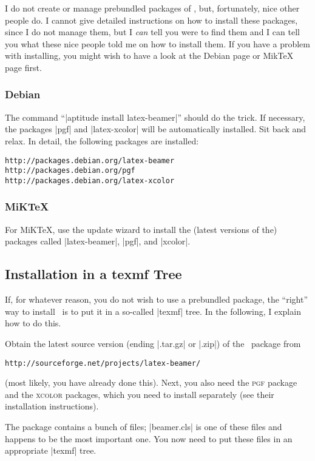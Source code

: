 I do not create or manage prebundled packages of \beamer, but,
fortunately, nice other people do. I cannot give detailed instructions
on how to install these packages, since I do not manage them, but I
\emph{can} tell you were to find them and I can tell you what these
nice people told me on how to install them. If you have a problem with
installing, you might wish to have a look at the Debian page or MikTeX
page first.


\subsubsection{Debian}

The command ``|aptitude install latex-beamer|'' should do the
trick. If necessary, the packages |pgf| and |latex-xcolor| will be
automatically installed. Sit back and relax. In detail, the following
packages are installed:
\begin{verbatim}
http://packages.debian.org/latex-beamer
http://packages.debian.org/pgf
http://packages.debian.org/latex-xcolor
\end{verbatim}


\subsubsection{MiKTeX}

For MiK\TeX, use the update wizard to install the (latest versions of
the) packages called |latex-beamer|, |pgf|, and |xcolor|.




\subsection{Installation in a texmf Tree}

If, for whatever reason, you do not wish to use a prebundled package,
the ``right'' way to install \beamer\ is to put it in a so-called
|texmf| tree. In the following, I explain how to do this.

Obtain the latest source version (ending |.tar.gz| or |.zip|) of the \beamer\
package from
\begin{verbatim}
http://sourceforge.net/projects/latex-beamer/
\end{verbatim}
(most likely, you have already done this). Next, you also need the
\textsc{pgf} package and the \textsc{xcolor} packages,
which you need to install separately (see their installation
instructions).

The package contains a bunch of files; |beamer.cls| is one of
these files and happens to be the most important one. You now need to
put these files in an appropriate |texmf| tree.

